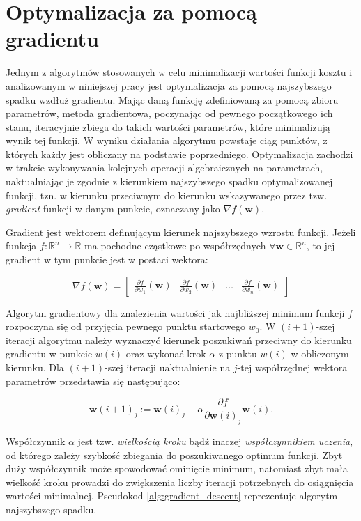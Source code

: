 \documentclass{pracamgr}
\begin{document}
\section{Optymalizacja za pomocą gradientu}
Jednym z algorytmów stosowanych w celu minimalizacji wartości funkcji kosztu i analizowanym w niniejszej pracy jest optymalizacja za pomocą najszybszego spadku wzdłuż gradientu. Mając daną funkcję zdefiniowaną za pomocą zbioru parametrów, metoda gradientowa, poczynając od pewnego początkowego ich stanu, iteracyjnie zbiega do takich wartości parametrów, które minimalizują wynik tej funkcji. W wyniku działania algorytmu powstaje ciąg punktów, z których każdy jest obliczany na podstawie poprzedniego. Optymalizacja zachodzi w trakcie wykonywania kolejnych operacji algebraicznych na parametrach, uaktualniając je zgodnie z kierunkiem najszybszego spadku optymalizowanej funkcji, tzn. w kierunku przeciwnym do kierunku wskazywanego przez tzw. \textit{gradient} funkcji w danym punkcie, oznaczany jako $\nabla f(\mathbf{w})$. 

Gradient jest wektorem definującym kierunek najszybszego wzrostu funkcji.
Jeżeli funkcja $f: \mathbb{R}^n \rightarrow \mathbb{R}$ ma pochodne cząstkowe po współrzędnych $\forall \mathbf{w} \in \mathbb{R}^n$, to jej gradient w tym punkcie jest w postaci wektora:

\[
\nabla f(\mathbf{w}) = \begin{bmatrix} \frac{\partial f}{\partial w_1} (\mathbf{w}) & \frac{\partial f}{\partial w_2} (\mathbf{w}) & \ldots & \frac{\partial f}{\partial w_n} (\mathbf{w}) \end{bmatrix}
\]

Algorytm gradientowy dla znalezienia wartości jak najbliższej minimum funkcji $f$ rozpoczyna się od przyjęcia pewnego punktu startowego $w_0$. W $(i+1)$-szej iteracji algorytmu należy wyznaczyć kierunek poszukiwań przeciwny do kierunku gradientu w punkcie $w(i)$ oraz wykonać krok $\alpha$ z punktu $w(i)$ w obliczonym kierunku. Dla $(i+1)$-szej iteracji uaktualnienie na $j$-tej współrzędnej wektora parametrów przedstawia się następująco:

\[
\mathbf{w}(i+1)_{j} := \mathbf{w}(i)_j - \alpha \frac{\partial f}{\partial \mathbf{w}(i)_j}\mathbf{w}(i).
\]

Współczynnik $\alpha$ jest tzw. \textit{wielkością kroku} bądź inaczej \textit{współczynnikiem uczenia}, od którego zależy szybkość zbiegania do poszukiwanego optimum funkcji. Zbyt duży współczynnik może spowodować ominięcie minimum, natomiast zbyt mała wielkość kroku prowadzi do zwiększenia liczby iteracji potrzebnych do osiągnięcia wartości minimalnej. Pseudokod \ref{alg:gradient_descent} reprezentuje algorytm najszybszego spadku.
\end{document}
